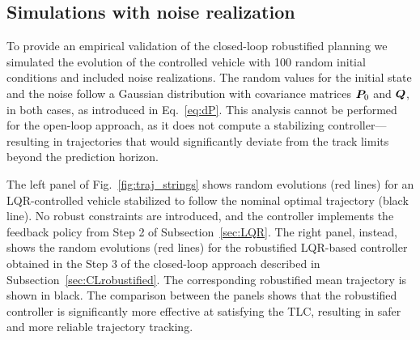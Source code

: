 \subsection{Simulations with noise realization}
To provide an empirical validation of the closed-loop robustified planning we simulated the evolution of the controlled vehicle with 100 random initial conditions and included noise realizations. The random values for the initial state and the noise follow a Gaussian distribution with covariance matrices $\boldsymbol{P}_0$ and $\boldsymbol{Q}$, in both cases, as introduced in Eq.~\eqref{eq:dP}. This analysis cannot be performed for the open-loop approach, as it does not compute a stabilizing controller---resulting in trajectories that would significantly deviate from the track limits beyond the prediction horizon.

The left panel of Fig.~\ref{fig:traj_strings} shows random evolutions (red lines) for an LQR-controlled vehicle stabilized to follow the nominal optimal trajectory (black line). No robust constraints are introduced, and the controller implements the feedback policy from Step 2 of Subsection~\ref{sec:LQR}. The right panel, instead, shows the random evolutions (red lines) for the robustified LQR-based controller obtained in the Step 3 of the closed-loop approach described in Subsection~\ref{sec:CLrobustified}. The corresponding robustified mean trajectory is shown in black.
The comparison between the panels shows that the robustified controller is significantly more effective at satisfying the TLC, resulting in safer and more reliable trajectory tracking.



